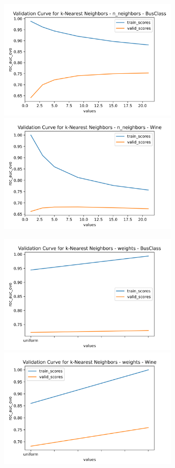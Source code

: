 \documentclass[
	letterpaper, %
]{jdf}
\begin{document}
\includegraphics[width=3.4in]{Figures/BusClass-0920/KNN/val_curve_0.png}
\includegraphics[width=3.4in]{Figures/Wine-0921/KNN/val_curve_0.png}

\includegraphics[width=3.4in]{Figures/BusClass-0920/KNN/val_curve_1.png}
\includegraphics[width=3.4in]{Figures/Wine-0921/KNN/val_curve_1.png}
\end{document}
